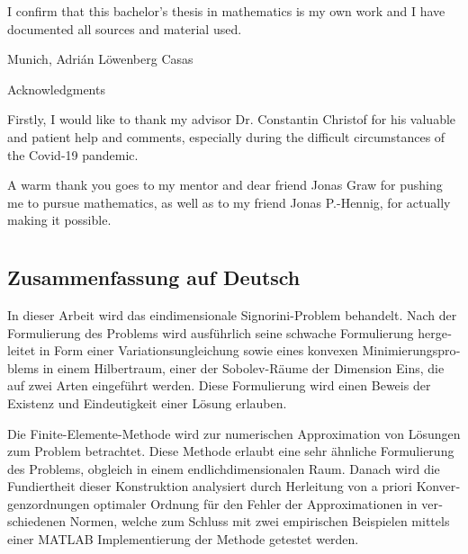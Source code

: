 \documentclass[headsepline,footsepline,footinclude=false,oneside,fontsize=11pt,paper=a4,listof=totoc,bibliography=totoc]{scrbook} %
\begin{document}
\thispagestyle{empty}
\vspace*{0.70\textheight}
\noindent
I confirm that this bachelor’s thesis in mathematics is my own work and I have
documented all sources and material used.

\vspace{30mm}
Munich,\hspace{80mm} Adrián Löwenberg Casas
\enlargethispage{10\baselineskip}
\newpage

\thispagestyle{empty}

\vspace*{20mm}

\begin{center}
	{ Acknowledgments}
\end{center}

\vspace{10mm}

\pagestyle{headings}
Firstly, I would like to thank my advisor Dr. Constantin Christof for his valuable and patient help and comments, especially during the difficult circumstances of the Covid-19 pandemic.

A warm thank you goes to my mentor and dear friend Jonas Graw for pushing me to pursue mathematics, as well as to my friend Jonas P.-Hennig, for actually making it possible.
\newpage

\chapter*{}
\vspace*{-2.2cm}
\section*{Zusammenfassung auf Deutsch}
\begin{otherlanguage}{german}
	In dieser Arbeit wird das eindimensionale Signorini-Problem behandelt. Nach der Formulierung des Problems wird ausführlich seine schwache Formulierung hergeleitet in Form einer Variationsungleichung sowie eines konvexen Minimierungsproblems in einem Hilbertraum, einer der Sobolev-Räume der Dimension Eins, die auf zwei Arten eingeführt werden. Diese Formulierung wird einen Beweis der Existenz und Eindeutigkeit einer Lösung erlauben.
	
	Die Finite-Elemente-Methode wird zur numerischen Approximation von Lösungen zum Problem betrachtet. Diese Methode erlaubt eine sehr ähnliche Formulierung des Problems, obgleich in einem endlichdimensionalen Raum. Danach wird die Fundiertheit dieser Konstruktion analysiert durch Herleitung von a priori Konvergenzordnungen optimaler Ordnung für den Fehler der Approximationen in verschiedenen Normen, welche zum Schluss mit zwei empirischen Beispielen mittels einer MATLAB Implementierung der Methode getestet werden.
\end{otherlanguage}
\end{document}
